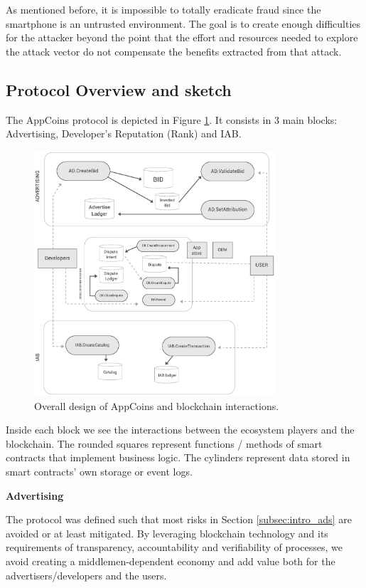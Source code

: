 As mentioned before, it is impossible to totally eradicate fraud since the smartphone is an untrusted environment. The goal is to create enough difficulties for the attacker beyond the point that the effort and resources needed to explore the attack vector do not compensate the benefits extracted from that attack.


\subsection{Protocol Overview and sketch}


The AppCoins protocol is depicted in Figure \ref{fig:design}. It consists in 3 main blocks: Advertising, 
Developer's Reputation (Rank) and IAB.

\begin{figure}[!ht]
\centering
\includegraphics[width=0.8\textwidth]{diagrams/design.eps}
\caption{Overall design of AppCoins and blockchain interactions.}
\label{fig:design}
\end{figure}

Inside each block we see the interactions between the ecosystem players and the blockchain. The 
rounded squares represent functions / methods of smart contracts that implement business logic. The 
cylinders represent data stored in smart contracts' own storage or event logs. \\

\medskip

{\bf Advertising}

The protocol was defined such that most risks in Section \ref{subsec:intro_ads} are avoided or at least mitigated. By leveraging blockchain technology and its requirements of transparency, accountability and verifiability of processes, we avoid creating a middlemen-dependent economy and add value both for the advertisers/developers and the users. \\

